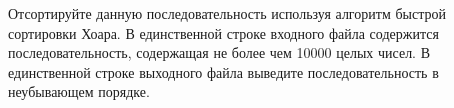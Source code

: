 Отсортируйте данную последовательность используя алгоритм быстрой сортировки Хоара.
\InputFile
В единственной строке входного файла содержится последовательность, содержащая не более чем 10000 целых чисел.
\OutputFile
В единственной строке выходного файла выведите последовательность в неубывающем порядке. 


